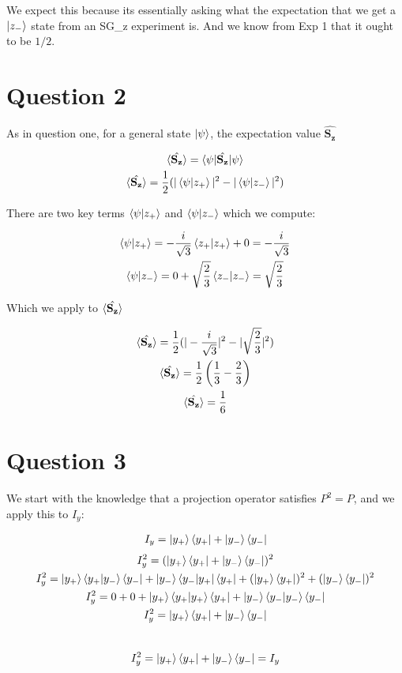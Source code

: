 \documentclass{article}
\let\oldhat\hat
\renewcommand{\hat}[1]{\oldhat{\mathbf{#1}}}
\begin{document}
    We expect this because its essentially asking what the expectation that we get a $\ket{z_-}$ state
    from an SG\_z experiment is. And we know from Exp 1 that it ought to be $1/2$.


\section{Question 2}

    As in question one, for a general state $\ket{\psi}$, the expectation value $\hat{S_z}$

    \begin{gather}
        \braket{\hat{S_z}} = \braket{\psi|\hat{S_z}|\psi}\\
        \braket{\hat{S_z}} = \frac{1}{2}(|\braket{\psi|z_+}|^2 - |\braket{\psi|z_-}|^2)
    \end{gather}

    There are two key terms $\braket{\psi|z_+}$ and $\braket{\psi|z_-}$ which we compute:

    \begin{gather}
        \braket{\psi|z_+} = -\frac{i}{\sqrt{3}}\braket{z_+|z_+} + 0 = -\frac{i}{\sqrt{3}}\\
        \braket{\psi|z_-} = 0 + \sqrt{\frac{2}{3}}\braket{z_-|z_-} = \sqrt{\frac{2}{3}}
    \end{gather}

    Which we apply to $\braket{\hat{S_z}}$

    \begin{gather}
        \braket{\hat{S_z}} = \frac{1}{2}(|-\frac{i}{\sqrt{3}}|^2 - |\sqrt{\frac{2}{3}}|^2)\\
        \braket{\hat{S_z}} = \frac{1}{2}\left( \frac{1}{3} - \frac{2}{3} \right)\\
        \braket{\hat{S_z}} = \frac{1}{6}
    \end{gather}



\section{Question 3}

    We start with the knowledge that a projection operator satisfies $P^2 = P$,
    and we apply this to $I_y$:

    \begin{gather}
        I_y = \ket{y_+}\bra{y_+} + \ket{y_-}\bra{y_-}
    \end{gather}
    \begin{gather*}
        I_y^2 = (\ket{y_+}\bra{y_+} + \ket{y_-}\bra{y_-})^2\\
        I_y^2 = \ket{y_+}\braket{y_+|y_-}\bra{y_-} + \ket{y_-}\bra{y_-|y_+}\bra{y_+}
        + (\ket{y_+}\bra{y_+})^2 + (\ket{y_-}\bra{y_-})^2\\
        I_y^2 = 0 + 0 + \ket{y_+}\braket{y_+|y_+}\bra{y_+} + \ket{y_-}\braket{y_-|y_-}\bra{y_-}\\
        I_y^2 = \ket{y_+}\bra{y_+} + \ket{y_-}\bra{y_-}
    \end{gather*}\
    \begin{gather*}
        I_y^2 = \ket{y_+}\bra{y_+} + \ket{y_-}\bra{y_-} = I_y
    \end{gather*}
\end{document}

